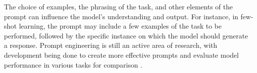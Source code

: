 The choice of examples, the phrasing of the task, and other elements of the prompt can influence the model's understanding and output. For instance, in few-shot learning, the prompt may include a few examples of the task to be performed, followed by the specific instance on which the model should generate a response. Prompt engineering is still an active area of research, with development being done to create more effective prompts and evaluate model performance in various tasks for comparison \cite{prompt_eng_1, liu-etal-2021-noisy}.
